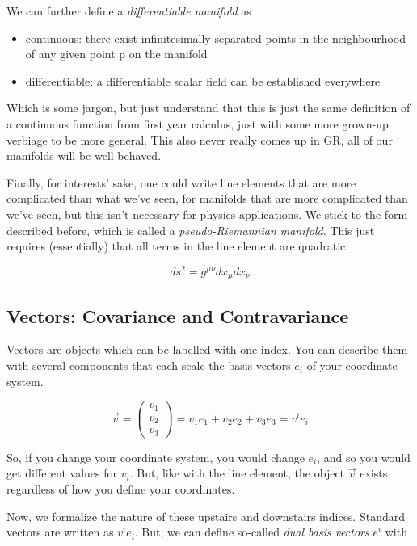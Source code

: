 \documentclass{article}
\begin{document}
We can further define a \textit{differentiable manifold} as
\begin{itemize}
    \item continuous: there exist infinitesimally separated points in the neighbourhood of any given point p on the manifold
    \item differentiable: a differentiable scalar field can be established everywhere
\end{itemize}

Which is some jargon, but just understand that this is just the same definition of a continuous function from first year calculus, just with some more grown-up verbiage to be more general. This also never really comes up in GR, all of our manifolds will be well behaved.

Finally, for interests' sake, one could write line elements that are more complicated than what we've seen, for manifolds that are more complicated than we've seen, but this isn't necessary for physics applications. We stick to the form described before, which is called a \textit{pseudo-Riemannian manifold}. This just requires (essentially) that all terms in the line element are quadratic.

\begin{equation}
    ds^2 = g^{\mu\nu} dx_\mu dx_\nu    
\end{equation}

\subsection{Vectors: Covariance and Contravariance}
Vectors are objects which can be labelled with one index. You can describe them with several components that each scale the basis vectors $e_i$ of your coordinate system. 

\begin{equation}
    \vec{v} = \begin{pmatrix} v_1 \\ v_2 \\ v_3 \end{pmatrix} = v_1 e_1 + v_2 e_2 + v_3 e_3 = v^i e_i
\end{equation}

So, if you change your coordinate system, you would change $e_i$, and so you would get different values for $v_i$. But, like with the line element, the object $\vec{v}$ exists regardless of how you define your coordinates.

Now, we formalize the nature of these upstairs and downstairs indices. Standard vectors are written as $v^i e_i$. But, we can define so-called \textit{dual basis vectors} $e^i$ with
\end{document}
